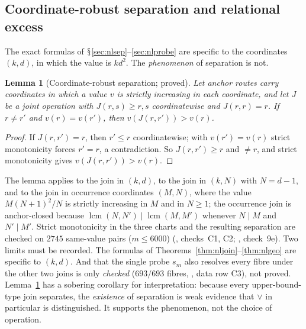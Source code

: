 \documentclass[11pt,a4paper]{article}
\renewcommand{\S}{\ensuremath{\mathsection}}
\newcommand{\lcm}{\operatorname{lcm}}
\newcommand{\vj}{\mathbin{\vee}}
\theoremstyle{plain}
\newtheorem{lemma}[theorem]{Lemma}
\theoremstyle{definition}
\begin{document}
\subsection{Coordinate-robust separation and relational excess}\label{sec:nlrobust}
The exact formulas of \S\ref{sec:nlsep}--\ref{sec:nlprobe} are specific to the coordinates $(k,d)$, in which the value is $kd^2$. The \emph{phenomenon} of separation is not.
\begin{lemma}[Coordinate-robust separation; proved]\label{lem:nlrobust}
Let anchor routes carry coordinates in which a value $v$ is strictly increasing in each coordinate, and let $J$ be a joint operation with $J(r,s)\ge r,s$ coordinatewise and $J(r,r)=r$. If $r\ne r'$ and $v(r)=v(r')$, then $v(J(r,r'))>v(r)$.
\end{lemma}
\begin{proof}
If $J(r,r')=r$, then $r'\le r$ coordinatewise; with $v(r')=v(r)$ strict monotonicity forces $r'=r$, a contradiction. So $J(r,r')\ge r$ and $\ne r$, and strict monotonicity gives $v(J(r,r'))>v(r)$.
\end{proof}
The lemma applies to the join in $(k,d)$, to the join in $(k,N)$ with $N=d-1$, and to the join in occurrence coordinates $(M,N)$, where the value $M(N+1)^2/N$ is strictly increasing in $M$ and in $N\ge1$; the occurrence join is anchor-closed because $\lcm(N,N')\mid\lcm(M,M')$ whenever $N\mid M$ and $N'\mid M'$.
Strict monotonicity in the three charts and the resulting separation are checked on $2745$ same-value pairs ($m\le6000$) (, checks~C1, C2; , check~9e).
Two limits must be recorded. The formulas of Theorems~\ref{thm:nljoin}--\ref{thm:nlgeo} are specific to $(k,d)$. And that the single probe $s_m$ also resolves every fibre under the other two joins is only \emph{checked} ($693/693$ fibres, , data row C3), not proved.
Lemma~\ref{lem:nlrobust} has a sobering corollary for interpretation: because every upper-bound-type join separates, the \emph{existence} of separation is weak evidence that $\vj$ in particular is distinguished. It supports the phenomenon, not the choice of operation.
\end{document}
